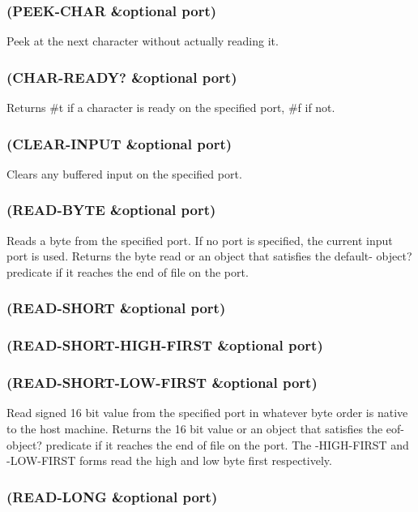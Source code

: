 \documentclass[11pt]{article}
\begin{document}
\subsubsection{(PEEK-CHAR \&optional port)}
\label{sec-4-34-4}

Peek at the next character without actually reading it.
\subsubsection{(CHAR-READY? \&optional port)}
\label{sec-4-34-5}

Returns \#t if a character is ready on the specified port, \#f if not.
\subsubsection{(CLEAR-INPUT \&optional port)}
\label{sec-4-34-6}

Clears any buffered input on the specified port.
\subsubsection{(READ-BYTE \&optional port)}
\label{sec-4-34-7}

Reads a byte from the specified port.  If no port is specified, the
current input port is used.  Returns the byte read or an object that
satisfies the default- object? predicate if it reaches the end of
file on the port.
\subsubsection{(READ-SHORT \&optional port)}
\label{sec-4-34-8}
\subsubsection{(READ-SHORT-HIGH-FIRST \&optional port)}
\label{sec-4-34-9}
\subsubsection{(READ-SHORT-LOW-FIRST \&optional port)}
\label{sec-4-34-10}

Read signed 16 bit value from the specified port in whatever byte
order is native to the host machine.  Returns the 16 bit value or an
object that satisfies the eof-object? predicate if it reaches the end
of file on the port.  The -HIGH-FIRST and -LOW-FIRST forms read the
high and low byte first respectively.
\subsubsection{(READ-LONG \&optional port)}
\label{sec-4-34-11}
\end{document}
